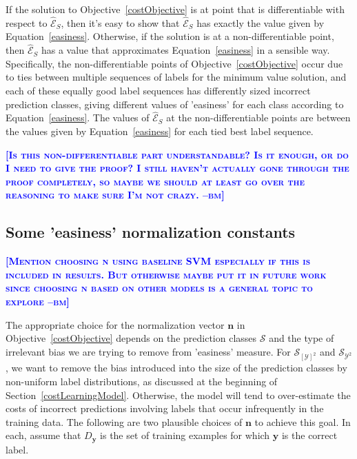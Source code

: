\documentclass{article} %
\newcommand{\bmcomment}[1]{\textcolor{blue}{\textsc{\textbf{[#1 --bm]}}}}
\begin{document}
If the solution to Objective~\ref{costObjective} is at point that is 
differentiable with respect to $\mathcal{\hat{E}}_S$, then it's easy to 
show that $\mathcal{\hat{E}}_S$ has exactly the value given by 
Equation~\ref{easiness}.
Otherwise, if the solution is at a non-differentiable point, then 
$\mathcal{\hat{E}}_S$ has a value that approximates Equation~\ref{easiness} in a sensible way.  Specifically, the non-differentiable points of Objective~\ref{costObjective}
occur due to ties between multiple sequences of labels for the 
minimum value solution, and each of these equally good label sequences has 
differently sized incorrect prediction classes, giving different
values of 'easiness' for each class according to Equation~\ref{easiness}.
The values of $\mathcal{\hat{E}}_S$ at the non-differentiable
points are between the values given by Equation~\ref{easiness}
for each tied best label sequence.

\bmcomment{Is this non-differentiable part understandable?  Is it enough,
or do I need to give the proof?  I still haven't actually gone through
the proof completely, so maybe we should at least go over the reasoning
to make sure I'm not crazy.}

\subsection{Some 'easiness' normalization constants}

\bmcomment{Mention choosing n using baseline 
SVM especially if this is included in results.  But otherwise
maybe put it in future work since choosing n based on other
models is a general topic to explore}

The appropriate choice for the normalization vector $\mathbf{n}$ in 
Objective~\ref{costObjective} depends on the prediction classes
$\mathcal{S}$ and the type of irrelevant bias we are trying to
remove from 'easiness' measure. For $\mathcal{S}_{[\mathcal{Y}]^2}$
and $\mathcal{S}_{\mathcal{Y}^2}$, we want to remove the bias introduced
into the size of the prediction classes by non-uniform label 
distributions, as discussed at the beginning of 
Section~\ref{costLearningModel}.  Otherwise, the model will 
tend to over-estimate
the costs of incorrect predictions involving labels that occur 
infrequently in the training data.  The following are two 
plausible choices of $\mathbf{n}$ to achieve this goal. In each,
assume that $D_\mathbf{y}$ is the set of training examples
for which $\mathbf{y}$ is the correct label.
\end{document}
